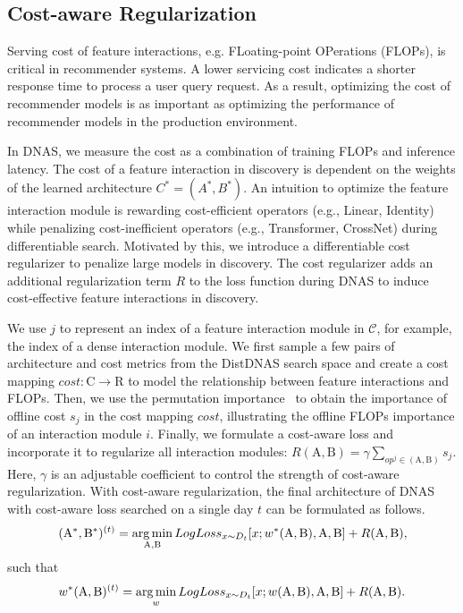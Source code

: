 \subsection{Cost-aware Regularization}
Serving cost of feature interactions, e.g. FLoating-point OPerations (FLOPs), is critical in recommender systems. A lower servicing cost indicates a shorter response time to process a user query request. As a result, optimizing the cost of recommender models is as important as optimizing the performance of recommender models in the production environment.

In DNAS, we measure the cost as a combination of training FLOPs and inference latency.
The cost of a feature interaction in discovery is dependent on the weights of the learned architecture $C^{*}=(A^{*}, B^{*})$. An intuition to optimize the feature interaction module is rewarding cost-efficient operators (e.g., Linear, Identity) while penalizing cost-inefficient operators (e.g., Transformer, CrossNet) during differentiable search.
Motivated by this, we introduce a differentiable cost regularizer to penalize large models in discovery.
The cost regularizer adds an additional regularization term $R$ to the loss function during DNAS to induce cost-effective feature interactions in discovery.


We use $j$ to represent an index of a feature interaction module in $\mathcal{C}$, for example, the index of a dense interaction module.
We first sample a few pairs of architecture and cost metrics from the DistDNAS search space and create a cost mapping $cost: \mathrm{C} \to \mathrm{R}$ to model the relationship between feature interactions and FLOPs.
Then, we use the permutation importance~\cite{breiman2001random} to obtain the importance of offline cost $s_{j}$ in the cost mapping $cost$, illustrating the offline FLOPs importance of an interaction module $i$. 
Finally, we formulate a cost-aware loss and incorporate it to regularize all interaction modules: $R(\mathrm{A}, \mathrm{B}) = \gamma \sum_{op^{j} \in (\mathrm{A}, \mathrm{B})}s_{j}$.
Here, $\gamma$ is an adjustable coefficient to control the strength of cost-aware regularization. With cost-aware regularization, the final architecture of DNAS with cost-aware loss searched on a single day $t$ can be formulated as follows.
\begin{equation}
    \small
    (\mathrm{A}^{*}, \mathrm{B}^{*})^{(t)} = \operatorname*{arg\,min}_{\mathrm{A}, \mathrm{B}} LogLoss_{x \sim D_{t}}[x; w^{*}(\mathrm{A}, \mathrm{B}), \mathrm{A}, \mathrm{B}] + R(\mathrm{A}, \mathrm{B}),
\end{equation}
such that 
\begin{equation}
\small
    w^{*}(\mathrm{A}, \mathrm{B})^{(t)} = \operatorname*{arg\,min}_{w} LogLoss_{x \sim D_{t}}[x; w(\mathrm{A}, \mathrm{B}), \mathrm{A}, \mathrm{B}] + R(\mathrm{A}, \mathrm{B}).
\end{equation}

